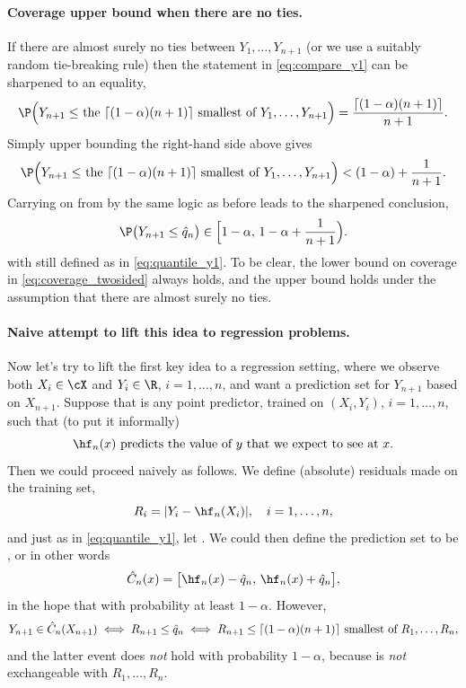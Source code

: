 \documentclass{article}
\begin{document}
\paragraph{Coverage upper bound when there are no ties.}

If there are almost surely no ties between $Y_1,\dots,Y_{n+1}$ (or we use a
suitably random tie-breaking rule) then the statement in \eqref{eq:compare_y1}
can be sharpened to an equality,  
\begin{equation}
\label{eq:compare_y3}
\P\Big( \text{$Y_{n+1} \leq$ the $\lceil (1-\alpha)(n+1) \rceil$ smallest of
  $Y_1,\dots,Y_{n+1}$} \Big) = \frac{\lceil (1-\alpha)(n+1) \rceil}{n+1}. 
\end{equation}
Simply upper bounding the right-hand side above gives
\begin{equation}
\label{eq:compare_y4}
\P\Big( \text{$Y_{n+1} \leq$ the $\lceil (1-\alpha)(n+1) \rceil$ smallest of
  $Y_1,\dots,Y_{n+1}$} \Big) < (1-\alpha) + \frac{1}{n+1}. 
\end{equation}
Carrying on from by the same logic as before leads to the sharpened conclusion, 
\begin{equation}
\label{eq:coverage_twosided}
\P\big( Y_{n+1} \leq \hq_n \big) \in \Big[ 1-\alpha, \, 1-\alpha + \frac{1}{n+1}
\Big).  
\end{equation}
with  still defined as in \eqref{eq:quantile_y1}. To be clear,
the lower bound on coverage in \eqref{eq:coverage_twosided} always holds, and
the upper bound holds under the assumption that there are almost surely no ties.  

\paragraph{Naive attempt to lift this idea to regression problems.} 

Now let's try to lift the first key idea to a regression setting, where we
observe both $X_i \in \cX$ and $Y_i \in \R$, $i=1,\dots,n$, and want a
prediction set for $Y_{n+1}$ based on $X_{n+1}$. Suppose that  is  
any point predictor, trained on $(X_i,Y_i)$, $i=1,\dots,n$, such that (to put it 
informally)  
\[
\text{$\hf_n(x)$ predicts the value of $y$ that we expect to see at $x$.}  
\]
Then we could proceed naively as follows. We define (absolute) residuals made on 
the training set,     
\[
R_i = |Y_i - \hf_n(X_i)|, \quad i=1,\dots,n,
\]
and just as in \eqref{eq:quantile_y1}, let . We could then define
the prediction set to be , or in other words
\[
\hC_n(x) = \big[ \hf_n(x) - \hq_n, \, \hf_n(x) + \hq_n \big], 
\]
in the hope that  with probability at least
$1-\alpha$. However, 
\[
Y_{n+1} \in \hat{C}_n(X_{n+1}) 
\iff R_{n+1} \leq \hat{q}_n 
\iff \text{$R_{n+1} \leq \lceil (1-\alpha)(n+1) \rceil$ smallest of
  $R_1,\dots,R_n$},   
\]
and the latter event does \emph{not} hold with probability $1-\alpha$, because
 is \emph{not} exchangeable with 
$R_1,\dots,R_n$. 
\end{document}
